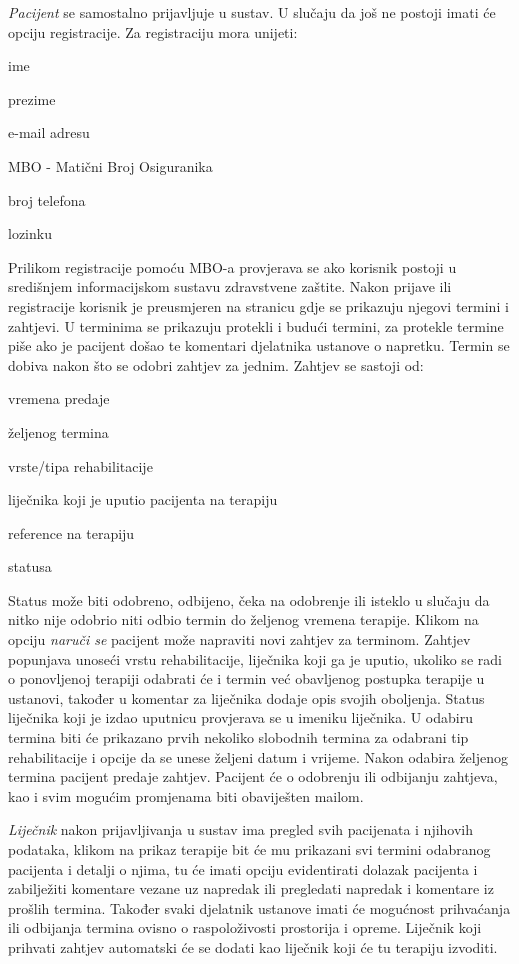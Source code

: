 		\textit{Pacijent} se samostalno prijavljuje u sustav. U slučaju da još ne postoji imati će opciju registracije. Za registraciju mora unijeti: 
		\begin{packed_item}
			\item ime
			\item prezime
			\item e-mail adresu
			\item MBO - Matični Broj Osiguranika
			\item broj telefona
			\item lozinku
		\end{packed_item}
		Prilikom registracije pomoću MBO-a provjerava se ako korisnik postoji u središnjem informacijskom sustavu zdravstvene zaštite.
		Nakon prijave ili registracije korisnik je preusmjeren na stranicu gdje se prikazuju njegovi termini i zahtjevi. U terminima se prikazuju protekli i budući termini, za protekle termine piše ako je pacijent došao te komentari djelatnika ustanove o napretku. Termin se dobiva nakon što se odobri zahtjev za jednim.		
		Zahtjev se sastoji od:
		\begin{packed_item}
			\item vremena predaje
			\item željenog termina
			\item vrste/tipa rehabilitacije
			\item liječnika koji je uputio pacijenta na terapiju
			\item reference na terapiju
			\item statusa
		\end{packed_item}
		Status može biti odobreno, odbijeno, čeka na odobrenje ili isteklo u slučaju da nitko nije odobrio niti odbio termin do željenog vremena terapije.
		Klikom na opciju \textit{naruči se} pacijent može napraviti novi zahtjev za terminom. Zahtjev popunjava unoseći vrstu rehabilitacije, liječnika koji ga je uputio, ukoliko se radi o ponovljenoj terapiji odabrati će i termin već obavljenog postupka terapije u ustanovi, također u komentar za liječnika dodaje opis svojih oboljenja. Status liječnika koji je izdao uputnicu provjerava se u imeniku liječnika. U odabiru termina biti će prikazano prvih nekoliko slobodnih termina za odabrani tip rehabilitacije i opcije da se unese željeni datum i vrijeme. Nakon odabira željenog termina pacijent predaje zahtjev. Pacijent će o odobrenju ili odbijanju zahtjeva, kao i svim mogućim promjenama biti obaviješten mailom.
		
		\textit{Liječnik} nakon prijavljivanja u sustav ima pregled svih pacijenata i njihovih podataka, klikom na prikaz terapije bit će mu prikazani svi termini odabranog pacijenta i detalji o njima, tu će imati opciju evidentirati dolazak pacijenta i zabilježiti komentare vezane uz napredak ili pregledati napredak i komentare iz prošlih termina. Također svaki djelatnik ustanove imati će mogućnost prihvaćanja ili odbijanja termina ovisno o raspoloživosti prostorija i opreme. Liječnik koji prihvati zahtjev automatski će se dodati kao liječnik koji će tu terapiju izvoditi. 
		
